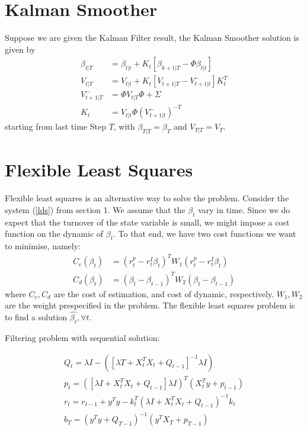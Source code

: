 \documentclass{article}
\theoremstyle{plain}
\theoremstyle{definition}
\theoremstyle{remark}
\begin{document}
\section{Kalman Smoother}
Suppose we are given the Kalman Filter result, the Kalman Smoother solution is given by
\begin{equation}
\begin{split}
\beta_{t|T} &= \beta_{t|t} + K_t [ \beta_{k+1|T} - \Phi \beta_{t|t}]\\
V_{t|T} &= V_{t|t} + K_t [ V_{t+1|T} - V^-_{t+1|t}] K^T_t\\
V^-_{t+1|T} &= \Phi V_{t|T}\Phi  + \Sigma\\
K_t &= V_{t|t} \Phi ({V_{t+1|t}^- })^{-T}
\end{split}
\end{equation}
starting from last time Step $T$, with $\beta_{T|T} = \beta_T$ and $V_{T|T} = V_{T}$.
\section{Flexible Least Squares}

Flexible least squares is an alternative way to solve the problem. Consider the system (\ref{lds}) from section 1. We assume that the $\beta_t$ vary in time. Since we do expect that the turnover of the state variable is small, we might impose a cost function on the dynamic of $\beta_t$. To that end, we have two cost functions we want to minimise, namely:
\begin{equation}
\begin{split}
C_e(\beta_t) &= (r^p_t - r^I_t \beta_t)^T W_1 (r^p_t - r^I_t \beta_t)\\
C_d(\beta_t) &= (\beta_{t} - \beta_{t-1} )^T W_2 (\beta_{t} - \beta_{t-1} )
\end{split}
\end{equation}
where $C_e, C_d$ are the cost of estimation, and cost of dynamic, respectively. $W_1, W_2$ are the weight prespecified in the problem. The flexible least squares problem is to find a solution $\hat{\beta_t}, \forall t$. 

Filtering problem with sequential solution:

\begin{eqnarray}
Q_t = \lambda {I - ([\lambda T + X_t^TX_t + Q_{t-1}]^{-1}\lambda I)}\\
p_t = ([\lambda I + X_t^TX_t + Q_{t-1}] \lambda I)^T (X_t^T y + p_{t-1})\\
r_t = r_{t-1} + y^T y - k_t ^T (\lambda I + X_t^TX_t + Q_{t-1})^{-1} k_t\\
b_T = (y^T y + Q_{T-1})^{-1} ( y^T X_T + p_{T-1})
\end{eqnarray}
\end{document}
